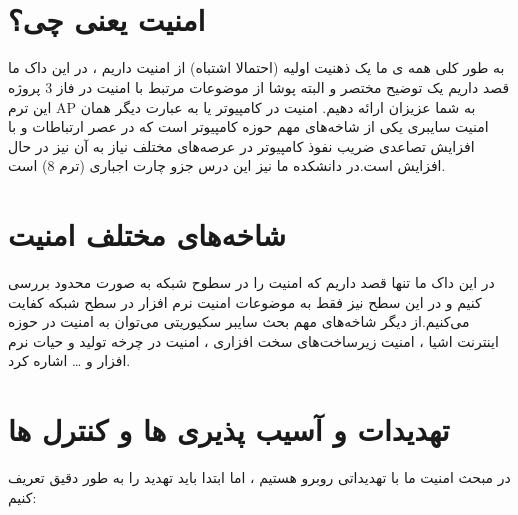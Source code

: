 \documentclass[]{article}
\begin{document}
\newpage
\pagestyle{fancy}
\fancyhf{}
\fancyfoot{}
\cfoot{\thepage}
\renewcommand{\headrulewidth}{2pt}

\KashidaOff



\tableofcontents

\newpage

 \Large \textbf{\\\\
}


\section*{{\titr امنیت یعنی چی؟}}

به طور کلی همه ی ما یک ذهنیت اولیه (احتمالا اشتباه) از امنیت داریم ، در این داک ما قصد داریم یک توضیح مختصر و البته پوشا از موضوعات مرتبط با امنیت در فاز 3 پروژه این ترم AP به شما عزیزان ارائه دهیم. امنیت در کامپیوتر یا به عبارت دیگر همان امنیت سایبری یکی از شاخه‌های مهم حوزه کامپیوتر است که در عصر ارتباطات و با افزایش تصاعدی ضریب نفوذ کامپیوتر در عرصه‌های مختلف نیاز به آن نیز در حال افزایش است.در دانشکده ما نیز این درس جزو چارت اجباری (ترم 8) است.


\section*{{\titr شاخه‌های مختلف امنیت}}
در این داک ما تنها قصد داریم که امنیت را در سطوح شبکه به صورت محدود بررسی کنیم و در این سطح نیز فقط به موضوعات امنیت نرم افزار در سطح شبکه کفایت می‌کنیم.از دیگر شاخه‌های مهم بحث سایبر سکیوریتی  می‌توان به امنیت در حوزه اینترنت اشیا ، امنیت زیرساخت‌های سخت افزاری ، امنیت در چرخه تولید و حیات نرم افزار و … اشاره کرد.




\section*{{\titr تهدیدات و آسیب پذیری ها و کنترل ها}}
در مبحث امنیت ما با تهدیداتی روبرو هستیم ، اما ابتدا باید تهدید را به طور دقیق تعریف کنیم:
\end{document}
